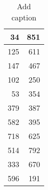 \begin{table}[htbp]
  \centering
  \caption{Add caption}
    \begin{tabular}{rr}
    \toprule
    34    & 851 \\
    \midrule
    125   & 611 \\
    147   & 467 \\
    102   & 250 \\
    53    & 354 \\
    379   & 387 \\
    582   & 395 \\
    718   & 625 \\
    514   & 792 \\
    333   & 670 \\
    596   & 191 \\
    \bottomrule
    \end{tabular}%
  \label{tab:addlabel}%
\end{table}%
